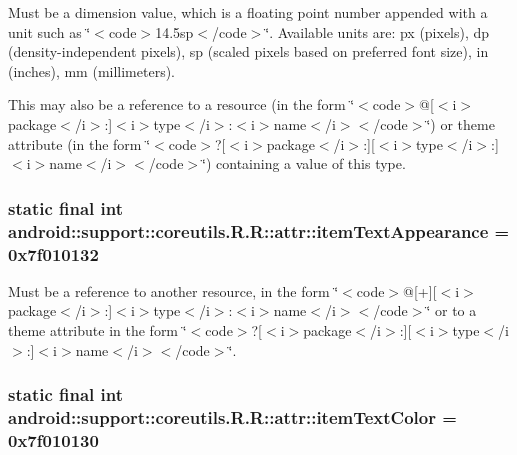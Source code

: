 Must be a dimension value, which is a floating point number appended with a unit such as \char`\"{}$<$code$>$14.5sp$<$/code$>$\char`\"{}. Available units are: px (pixels), dp (density-independent pixels), sp (scaled pixels based on preferred font size), in (inches), mm (millimeters). 

This may also be a reference to a resource (in the form \char`\"{}$<$code$>$@\mbox{[}$<$i$>$package$<$/i$>$:\mbox{]}$<$i$>$type$<$/i$>$:$<$i$>$name$<$/i$>$$<$/code$>$\char`\"{}) or theme attribute (in the form \char`\"{}$<$code$>$?\mbox{[}$<$i$>$package$<$/i$>$:\mbox{]}\mbox{[}$<$i$>$type$<$/i$>$:\mbox{]}$<$i$>$name$<$/i$>$$<$/code$>$\char`\"{}) containing a value of this type. \hypertarget{classandroid_1_1support_1_1coreutils_1_1_r_1_1attr_8ffdaaa55986f7596a85d6633d25e631}{
\subsubsection[{itemTextAppearance}]{\setlength{\rightskip}{0pt plus 5cm}static final int android::support::coreutils.R.R::attr::itemTextAppearance = 0x7f010132}}
\label{classandroid_1_1support_1_1coreutils_1_1_r_1_1attr_8ffdaaa55986f7596a85d6633d25e631}


Must be a reference to another resource, in the form \char`\"{}$<$code$>$@\mbox{[}+\mbox{]}\mbox{[}$<$i$>$package$<$/i$>$:\mbox{]}$<$i$>$type$<$/i$>$:$<$i$>$name$<$/i$>$$<$/code$>$\char`\"{} or to a theme attribute in the form \char`\"{}$<$code$>$?\mbox{[}$<$i$>$package$<$/i$>$:\mbox{]}\mbox{[}$<$i$>$type$<$/i$>$:\mbox{]}$<$i$>$name$<$/i$>$$<$/code$>$\char`\"{}. \hypertarget{classandroid_1_1support_1_1coreutils_1_1_r_1_1attr_24f4af0176760e5716dcc6bfce83def5}{
\subsubsection[{itemTextColor}]{\setlength{\rightskip}{0pt plus 5cm}static final int android::support::coreutils.R.R::attr::itemTextColor = 0x7f010130}}
\label{classandroid_1_1support_1_1coreutils_1_1_r_1_1attr_24f4af0176760e5716dcc6bfce83def5}


